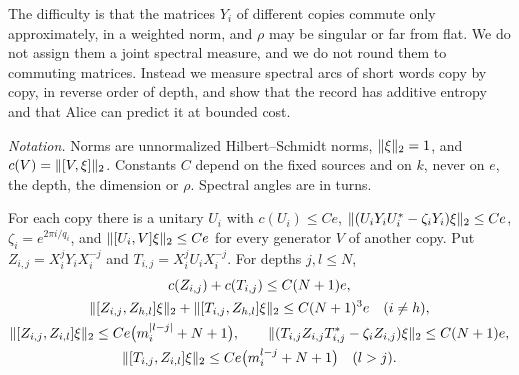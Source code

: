 The difficulty is that the matrices $Y_i$ of different copies commute only approximately, in a weighted norm, and
$\rho$ may be singular or far from flat. We do not assign them a joint spectral measure, and we do not round them to
commuting matrices. Instead we measure spectral arcs of short words copy by copy, in reverse order of depth, and show
that the record has additive entropy and that Alice can predict it at bounded cost.

\emph{Notation.} Norms are unnormalized Hilbert--Schmidt norms, $\lVert \xi\rVert_2=1$, and $c(V)=\lVert [V,\xi]\rVert_2$. Constants $C$ depend on the
fixed sources and on $k$, never on $e$, the depth, the dimension or $\rho$. Spectral angles are in turns.

\begin{lemma}\label{lem:short-words}
For each copy there is a unitary $U_i$ with $c(U_i)\le Ce$, $\lVert (U_iY_iU_i^*-\zeta_iY_i)\xi\rVert_2\le Ce$, $\zeta_i=e^{2\pi i/q_i}$, and
$\lVert [U_i,V]\xi\rVert_2\le Ce$ for every generator $V$ of another copy. Put $Z_{i,j}=X_i^jY_iX_i^{-j}$ and $T_{i,j}=X_i^jU_iX_i^{-j}$. For
depths $j,l\le N$,
\begin{gather*}
c(Z_{i,j})+c(T_{i,j})\le C(N+1)e,\\
\lVert [Z_{i,j},Z_{h,l}]\xi\rVert_2+\lVert [T_{i,j},Z_{h,l}]\xi\rVert_2\le C(N+1)^3e\quad(i\ne h),\\
\lVert [Z_{i,j},Z_{i,l}]\xi\rVert_2\le Ce\bigl(m_i^{|l-j|}+N+1\bigr),\qquad\lVert (T_{i,j}Z_{i,j}T_{i,j}^*-\zeta_iZ_{i,j})\xi\rVert_2\le C(N+1)e,\\
\lVert [T_{i,j},Z_{i,l}]\xi\rVert_2\le Ce\bigl(m_i^{l-j}+N+1\bigr)\quad(l>j).
\end{gather*}
\end{lemma}

